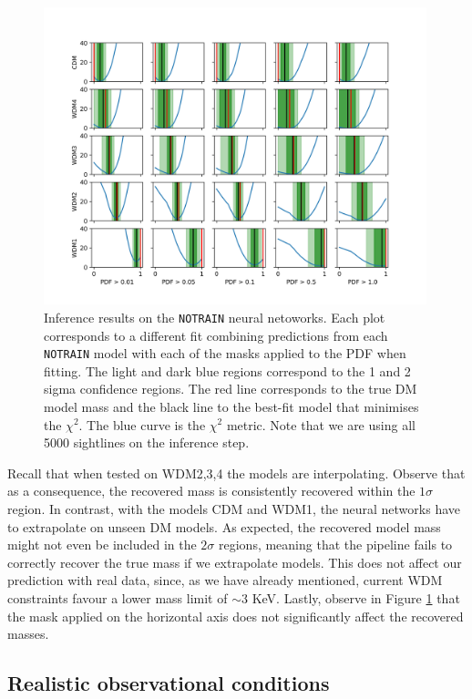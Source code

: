 \begin{figure}
    \centering
    \includegraphics[width=0.99\textwidth]{img/ML/inference_no_train.png}
    \caption{Inference results on the \texttt{NOTRAIN} neural netoworks. Each plot corresponds to a different fit combining predictions from each \texttt{NOTRAIN} model with each of the masks applied to the PDF when fitting. The light and dark blue regions correspond to the 1 and 2 sigma confidence regions. The red line corresponds to the true DM model mass and the black line to the best-fit model that minimises the $\chi^2$. The blue curve is the $\chi^2$ metric. Note that we are using all 5000 sightlines on the inference step.}
    \label{fig:inference no train}
\end{figure}
Recall that when tested on WDM2,3,4 the models are interpolating. Observe that as a consequence, the recovered mass is consistently recovered within the $1\sigma$ region. In contrast, with the models CDM and WDM1, the neural networks have to extrapolate on unseen DM models. As expected, the recovered model mass might not even be included in the $2\sigma$ regions, meaning that the pipeline fails to correctly recover the true mass if we extrapolate models. This does not affect our prediction with real data, since, as we have already mentioned, current WDM constraints favour a lower mass limit of $\sim 3$ KeV. Lastly, observe in Figure \ref{fig:inference no train} that the mask applied on the horizontal axis does not significantly affect the recovered masses.


\subsection{Realistic observational conditions}\label{sec:hires test}

